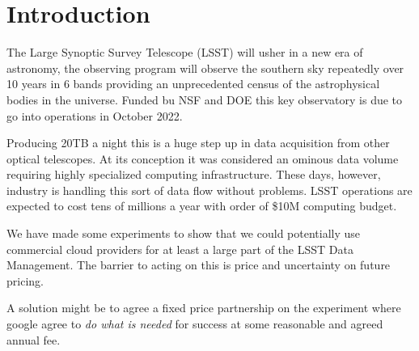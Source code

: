 \section{Introduction}
The Large Synoptic Survey Telescope (\gls{LSST}) will usher in a new era of astronomy, the observing program will observe the southern sky repeatedly over 10 years in 6 bands providing an unprecedented  census of the astrophysical bodies in the universe.  Funded bu \gls{NSF} and \gls{DOE} this key observatory is due to go into operations in October 2022.

Producing 20TB a night this is a huge step up in data acquisition from other optical telescopes. At its conception it was considered an ominous data volume requiring highly specialized computing infrastructure. These days, however, industry is handling this sort of data flow without problems. \gls{LSST}  operations are expected to cost tens of millions a year with order of \$10M computing budget.

We have made some experiments to show that we could potentially use commercial cloud providers for at least a large part of the \gls{LSST} \gls{Data Management}.  The barrier to acting on this is price and uncertainty on future pricing.

A solution might be to agree a fixed price partnership on the experiment where google agree to \emph{do what is needed} for success at some reasonable and agreed annual fee.






